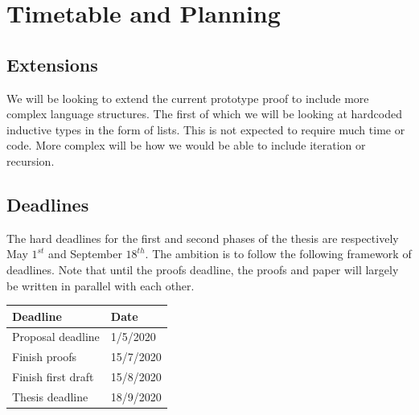 \documentclass[12pt, final]{article}
\begin{document}
\section{Timetable and Planning}

\subsection{Extensions}

We will be looking to extend the current prototype proof to include more complex language structures. The first of which we will be looking at hardcoded inductive types in the form of lists. This is not expected to require much time or code. More complex will be how we would be able to include iteration or recursion.


\subsection{Deadlines}

The hard deadlines for the first and second phases of the thesis are respectively May $1^{st}$ and September $18^{th}$. The ambition is to follow the following framework of deadlines. Note that until the proofs deadline, the proofs and paper will largely be written in parallel with each other.


\begin{center}
  \begin{tabular}{ | m{5cm} | m{5cm} | }
    \hline
    Deadline          & Date  \\
    \hline
    Proposal deadline & 1/5/2020 \\
    Finish proofs & 15/7/2020 \\
    Finish first draft & 15/8/2020 \\
    Thesis deadline & 18/9/2020 \\
    \hline
  \end{tabular}
\end{center}

\printbibliography
\makeatother
\end{document}
